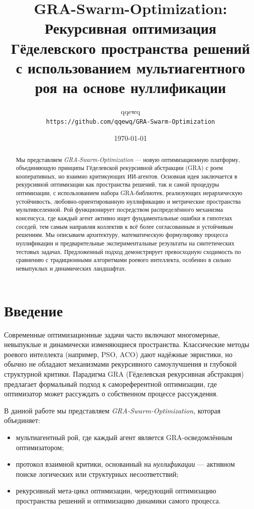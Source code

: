\documentclass[12pt,a4paper]{article}
\title{GRA-Swarm-Optimization: \\ Рекурсивная оптимизация Гёделевского пространства решений \\ с использованием мультиагентного роя на основе нуллификации}
\author{qqewq \\ \texttt{https://github.com/qqewq/GRA-Swarm-Optimization}}
\date{\today}
\begin{document}
\maketitle

\begin{abstract}
Мы представляем \textit{GRA-Swarm-Optimization} — новую оптимизационную платформу, объединяющую принципы Гёделевской рекурсивной абстракции (GRA) с роем кооперативных, но взаимно критикующих ИИ-агентов. Основная идея заключается в рекурсивной оптимизации как пространства решений, так и самой процедуры оптимизации, с использованием набора GRA-библиотек, реализующих иерархическую устойчивость, любовно-ориентированную нуллификацию и метрические пространства мультивселенной. Рой функционирует посредством распределённого механизма консенсуса, где каждый агент активно ищет фундаментальные ошибки в гипотезах соседей, тем самым направляя коллектив к всё более согласованным и устойчивым решениям. Мы описываем архитектуру, математическую формулировку процесса нуллификации и предварительные экспериментальные результаты на синтетических тестовых задачах. Предложенный подход демонстрирует превосходную сходимость по сравнению с традиционными алгоритмами роевого интеллекта, особенно в сильно невыпуклых и динамических ландшафтах.
\end{abstract}

\section{Введение}
Современные оптимизационные задачи часто включают многомерные, невыпуклые и динамически изменяющиеся пространства. Классические методы роевого интеллекта (например, PSO, ACO) дают надёжные эвристики, но обычно не обладают механизмами рекурсивного самоулучшения и глубокой структурной критики. Парадигма GRA (Гёделевская рекурсивная абстракция) предлагает формальный подход к самореферентной оптимизации, где оптимизатор может рассуждать о собственном процессе рассуждения.

В данной работе мы представляем \textit{GRA-Swarm-Optimization}, которая объединяет:
\begin{itemize}
    \item мультиагентный рой, где каждый агент является GRA-осведомлённым оптимизатором;
    \item протокол взаимной критики, основанный на \textit{нуллификации} — активном поиске логических или структурных несоответствий;
    \item рекурсивный мета-цикл оптимизации, чередующий оптимизацию пространства решений и оптимизацию динамики самого процесса.
\end{itemize}
\end{document}
